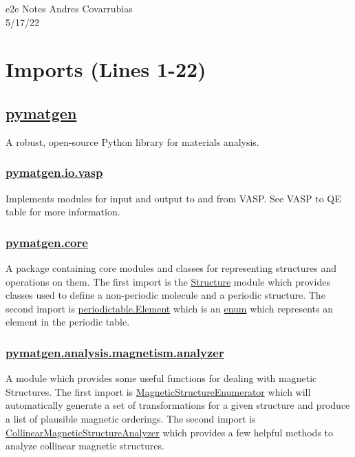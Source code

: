 \documentclass[12pt]{article}
\begin{document}
\noindent e2e Notes \hfill Andres Covarrubias    \\
5/17/22

\hrulefill
\tableofcontents
\newpage
{}
\section*{Imports (Lines 1-22)}
\subsection*{\href{https://pymatgen.org/}{pymatgen}}
A robust, open-source Python library for materials analysis.

    \subsubsection*{\href{https://pymatgen.org/pymatgen.io.vasp.html?highlight=io\%20vasp\#module-pymatgen.io.vasp}{pymatgen.io.vasp}} Implements modules for input and output to and from VASP. See VASP to QE table for more information. 
    
    \subsubsection*{\href{https://pymatgen.org/pymatgen.core.html}{pymatgen.core}} A package containing core modules and classes for representing structures and operations on them. The first import is the \href{https://pymatgen.org/pymatgen.core.structure.html?highlight=structure#module-pymatgen.core.structure}{Structure} module which provides classes used to define a non-periodic molecule and a periodic structure. The second import is \href{https://pymatgen.org/pymatgen.core.periodic_table.html?highlight=element#pymatgen.core.periodic_table.Element}{periodic\textunderscore table.Element} which is an \href{https://docs.python.org/3/library/enum.html}{enum} which represents an element in the periodic table. 
    
    \subsubsection*{\href{https://pymatgen.org/pymatgen.analysis.magnetism.analyzer.html}{pymatgen.analysis.magnetism.analyzer}} A module which provides some useful functions for dealing with magnetic Structures. The first import is  \href{https://pymatgen.org/pymatgen.analysis.magnetism.analyzer.html?highlight=magneticstructureenumerator#pymatgen.analysis.magnetism.analyzer.MagneticStructureEnumerator}{MagneticStructureEnumerator} which will automatically generate a set of transformations for a given structure and produce a list of plausible magnetic orderings. The second import is \href{https://pymatgen.org/pymatgen.analysis.magnetism.analyzer.html?highlight=collinearmagneticstructureanalyzer#pymatgen.analysis.magnetism.analyzer.CollinearMagneticStructureAnalyzer}{CollinearMagneticStructureAnalyzer} which provides a few helpful methods to analyze collinear magnetic structures.
\end{document}

